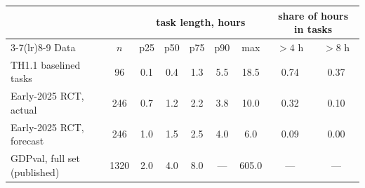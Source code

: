 \setlength{\tabcolsep}{4pt}\begin{tabular}{@{}lcccccccc@{}}
\toprule
 & & \multicolumn{5}{c}{task length, hours} & \multicolumn{2}{c}{share of hours in tasks} \\
\cmidrule(lr){3-7}\cmidrule(lr){8-9}
Data & $n$ & p25 & p50 & p75 & p90 & max & $>4$ h & $>8$ h \\
\midrule
TH1.1 baselined tasks & 96 & 0.1 & 0.4 & 1.3 & 5.5 & 18.5 & 0.74 & 0.37 \\
Early-2025 RCT, actual & 246 & 0.7 & 1.2 & 2.2 & 3.8 & 10.0 & 0.32 & 0.10 \\
Early-2025 RCT, forecast & 246 & 1.0 & 1.5 & 2.5 & 4.0 & 6.0 & 0.09 & 0.00 \\
GDPval, full set (published) & 1320 & 2.0 & 4.0 & 8.0 & --- & 605.0 & --- & --- \\
\bottomrule
\end{tabular}
